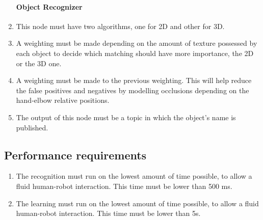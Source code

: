 \begin{enumerate}[label=\textbf{FR\threedigits*}, leftmargin=2cm]
\paragraph{Object Recognizer}
	\item This node must have two algorithms, one for 2D and other for 3D. 
	\item A weighting must be made depending on the amount of texture possessed by each object to decide which matching should have more importance, the 2D or the 3D one. 
	\item A weighting must be made to the previous weighting. This will help reduce the false positives and negatives by modelling occlusions depending on the hand-elbow relative positions. 
	\item The output of this node must be a topic in which the object's name is published.
	






\end{enumerate}



\subsection{Performance requirements}

\begin{enumerate}[label=\textbf{PR\threedigits*}]
\item The recognition must run on the lowest amount of time possible, to allow a fluid human-robot interaction. This time must be lower than 500 ms. 
\item The learning must run on the lowest amount of time possible, to allow a fluid human-robot interaction. This time must be lower than 5s. 
\end{enumerate}



